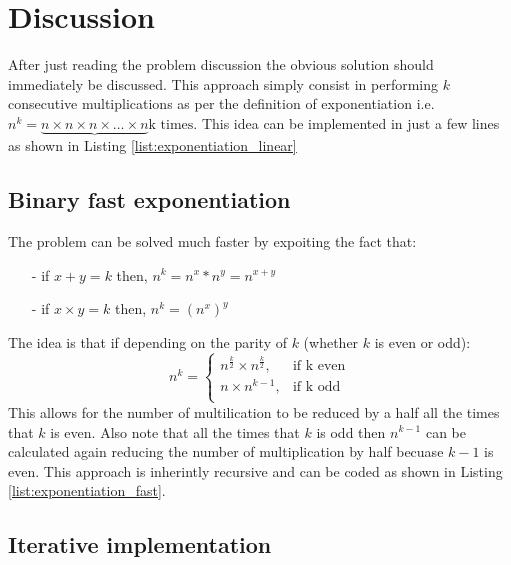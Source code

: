 \section{Discussion}
\label{exponentiation:sec:discussion}
After just reading the problem discussion the obvious solution should immediately be discussed. This approach simply consist in performing $k$ consecutive multiplications as per the definition of exponentiation i.e. $n^k = \underbrace{n \times n \times n \times \ldots \times n}\text{k times}$. This idea can be implemented in just a few lines as shown in Listing \ref{list:exponentiation_linear}



\subsection{Binary fast exponentiation}
\label{exponentiation:sec:fast_exponentiation}
The problem can be solved much faster by expoiting the fact that:
\begin{itemize}
	\item[-] if $x+y=k$ then, $n^k = n^x * n^y = n^{x+y}$ 
	\item[-] if $x \times y=k$ then, $n^k = (n^x)^y$
\end{itemize}
The idea is that if depending on the parity of $k$ (whether $k$ is even or odd):
  \[
    n^k = \begin{cases}
        		n^{\frac{k}{2}} \times n^{\frac{k}{2}}, & \text{if  k even}\\
        		n \times n^{k-1}, & \text{if k odd}\\
	        \end{cases}
  \]
This allows for the number of multilication to be reduced by a half all the times that $k$ is even. Also note that all the times that $k$ is odd then $n^{k-1}$ can be calculated again reducing the number of multiplication by half becuase $k-1$ is even. This approach is inherintly recursive and can be coded as shown in Listing \ref{list:exponentiation_fast}.



\subsection{Iterative implementation}


